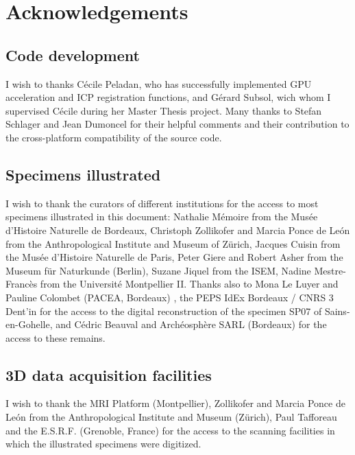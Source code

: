 
\chapter{Acknowledgements}
\minitoc 

\section {Code development}
I wish to thanks Cécile Peladan, who has successfully implemented GPU acceleration and ICP registration functions, and Gérard Subsol, wich whom I supervised Cécile during her Master Thesis project. Many thanks to Stefan Schlager and Jean Dumoncel for their helpful comments and their contribution to the cross-platform compatibility of the source code.

\section{Specimens illustrated} 
I wish to thank the curators of different institutions for the access to most specimens illustrated
in this document: Nathalie Mémoire from the Musée d'Histoire Naturelle de Bordeaux, Christoph
Zollikofer and Marcia Ponce de León from the Anthropological Institute and Museum of Zürich,
Jacques Cuisin from the Musée d’Histoire Naturelle de Paris, Peter Giere and Robert Asher from the
Museum für Naturkunde (Berlin), Suzane Jiquel from the ISEM, Nadine Mestre-Francès from the
Université Montpellier II. Thanks also to Mona Le Luyer and Pauline Colombet (PACEA, Bordeaux) ,
the PEPS IdEx Bordeaux / CNRS 3 Dent'in for the access to the digital reconstruction of the specimen
SP07 of Sains-en-Gohelle, and Cédric Beauval and Archéosphère SARL (Bordeaux) for the access to
these remains.

\section{3D data acquisition facilities} 
I wish to thank the MRI Platform (Montpellier), Zollikofer and Marcia Ponce de León from the
Anthropological Institute and Museum (Zürich), Paul Tafforeau and the E.S.R.F. (Grenoble, France) for
the access to the scanning facilities in which the illustrated specimens were digitized.
